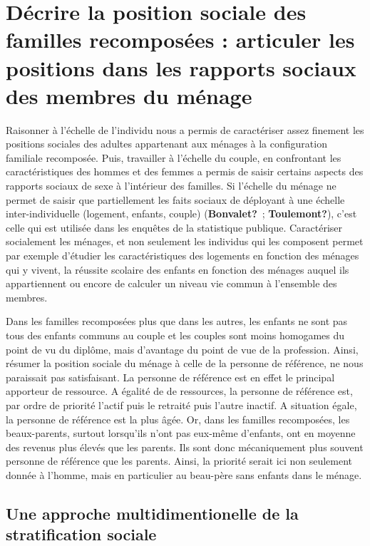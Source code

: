 \documentclass[
  12pt,
]{book}
\begin{document}
\section{Décrire la position sociale des familles recomposées :
articuler les positions dans les rapports sociaux des membres du
ménage}\label{duxe9crire-la-position-sociale-des-familles-recomposuxe9es-articuler-les-positions-dans-les-rapports-sociaux-des-membres-du-muxe9nage}

Raisonner à l'échelle de l'individu nous a permis de caractériser assez
finement les positions sociales des adultes appartenant aux ménages à la
configuration familiale recomposée. Puis, travailler à l'échelle du
couple, en confrontant les caractéristiques des hommes et des femmes a
permis de saisir certains aspects des rapports sociaux de sexe à
l'intérieur des familles. Si l'échelle du ménage ne permet de saisir que
partiellement les faits sociaux de déployant à une échelle
inter-individuelle (logement, enfants, couple) (\textbf{Bonvalet?}~;
\textbf{Toulemont?}), c'est celle qui est utilisée dans les enquêtes de
la statistique publique. Caractériser socialement les ménages, et non
seulement les individus qui les composent permet par exemple d'étudier
les caractéristiques des logements en fonction des ménages qui y vivent,
la réussite scolaire des enfants en fonction des ménages auquel ils
appartiennent ou encore de calculer un niveau vie commun à l'ensemble
des membres.

Dans les familles recomposées plus que dans les autres, les enfants ne
sont pas tous des enfants communs au couple et les couples sont moins
homogames du point de vu du diplôme, mais d'avantage du point de vue de
la profession. Ainsi, résumer la position sociale du ménage à celle de
la personne de référence, ne nous paraissait pas satisfaisant. La
personne de référence est en effet le principal apporteur de ressource.
A égalité de de ressources, la personne de référence est, par ordre de
priorité l'actif puis le retraité puis l'autre inactif. A situation
égale, la personne de référence est la plus âgée. Or, dans les familles
recomposées, les beaux-parents, surtout lorsqu'ils n'ont pas eux-même
d'enfants, ont en moyenne des revenus plus élevés que les parents. Ils
sont donc mécaniquement plus souvent personne de référence que les
parents. Ainsi, la priorité serait ici non seulement donnée à l'homme,
mais en particulier au beau-père sans enfants dans le ménage.

\subsection{Une approche multidimentionelle de la stratification
sociale}\label{une-approche-multidimentionelle-de-la-stratification-sociale}
\end{document}
